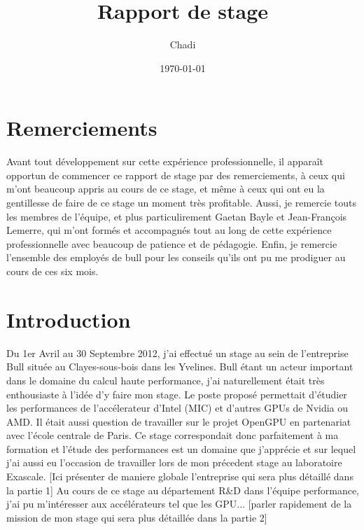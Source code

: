 \documentclass{article}
\title{Rapport de stage}
\author{Chadi \bsc{AKEL}}
\date{\today}
\begin{document}
\pagestyle{fancy}
\lhead{\thepart}
\chead{}
\lfoot{}
\cfoot{\thepage}
\rfoot{}
\maketitle
\newpage
{}
\renewcommand{\contentsname}{Sommaire}
\tableofcontents

\newpage
{}
\part{Remerciements}
	Avant tout développement sur cette expérience professionnelle, il apparaît opportun de commencer ce rapport de stage par des remerciements, 
	à ceux qui m'ont beaucoup appris au cours de ce stage, et même à ceux qui ont eu la gentillesse de faire de ce stage un moment très profitable. 
	Aussi, je remercie touts les membres de l'équipe, et plus particulirement Gaetan Bayle et Jean-François Lemerre, qui m'ont formés et accompagnés 
	tout au long de cette expérience professionnelle avec beaucoup de patience et de pédagogie. Enfin, je remercie l'ensemble des employés de bull 
	pour les conseils qu'ils ont pu me prodiguer au cours de ces six mois.

\newpage
{}
\part{Introduction}
	Du 1er Avril au 30 Septembre 2012, j’ai effectué un stage au sein de l’entreprise Bull située au Clayes-sous-bois 
	dans les Yvelines. Bull étant un acteur important dans le domaine du calcul haute performance, j'ai naturellement 
	était très enthousiaste à l'idée d'y faire mon stage. Le poste proposé permettait d'étudier les performances de 
	l'accélerateur d'Intel (MIC) et d'autres GPUs de Nvidia ou AMD. Il était aussi question de travailler sur le projet 
	OpenGPU en partenariat avec l'école centrale de Paris. Ce stage correspondait donc parfaitement à ma formation et 
	l'étude des performances est un domaine que j'apprécie et sur lequel j'ai aussi eu l'occasion de travailler lors de 
	mon précedent stage au laboratoire Exascale.
	[Ici présenter de maniere globale l'entreprise qui sera plus détaillé dans la partie 1]
	Au cours de ce stage au département R\&D dans l'équipe performance, j’ai pu m’intéresser aux accélérateurs tel que les GPU... 
	[parler rapidement de la mission de mon stage qui sera plus détaillée dans la partie 2]

\newpage
{}
\end{document}

